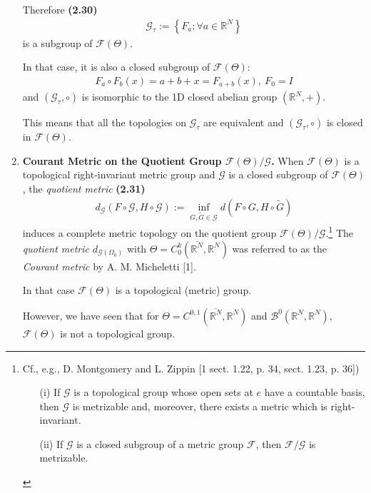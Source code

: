 \documentclass{book}
\numberwithin{equation}{section}
\begin{document}
\begin{enumerate}
    Therefore \textbf{(2.30)}
    \begin{align*}
        \mathcal{G}_\tau := \left\{F_a;\forall a\in\mathbb{R}^N\right\}
    \end{align*}
    is a subgroup of $\mathcal{F}(\Theta)$.
    
    In that case, it is also a closed subgroup of $\mathcal{F}(\Theta)$:
    \begin{align*}
        F_a\circ F_b(x) = a + b + x = F_{a+b}(x),\ F_0 = I
    \end{align*}
    and $(\mathcal{G}_\tau,\circ)$ is isomorphic to the 1D closed abelian group $(\mathbb{R}^N,+)$.
    
    This means that all the topologies on $\mathcal{G}_\tau$ are equivalent and $(\mathcal{G}_\tau,\circ)$ is closed in $\mathcal{F}(\Theta)$.
    \item \textbf{Courant Metric on the Quotient Group $\mathcal{F}(\Theta)/\mathcal{G}$.} When $\mathcal{F}(\Theta)$ is a topological right-invariant metric group and $\mathcal{G}$ is a closed subgroup of $\mathcal{F}(\Theta)$, the \textit{quotient metric} \textbf{(2.31)}
    \begin{align*}
        d_{\mathcal{G}}\left(F\circ\mathcal{G},H\circ\mathcal{G}\right) := \inf_{G,\widetilde{G}\in\mathcal{G}} d\left(F\circ G,H\circ\widetilde{G}\right)
    \end{align*}
    induces a complete metric topology on the quotient group $\mathcal{F}(\Theta)/\mathcal{G}$.\footnote{Cf., e.g., D. Montgomery and L. Zippin [1 sect. 1.22, p. 34, sect. 1.23, p. 36])
        \begin{itemize}
            \item[(i)] If $\mathcal{G}$ is a topological group whose open sets at $e$ have a countable basis, then $\mathcal{G}$ is metrizable and, moreover, there exists a metric which is right-invariant.
            \item[(ii)] If $\mathcal{G}$ is a closed subgroup of a metric group $\mathcal{F}$, then $\mathcal{F}/\mathcal{G}$ is metrizable.
    \end{itemize}}
    The \textit{quotient metric} $d_{\mathcal{G}\left(\Omega_0\right)}$ with $\Theta = C_0^k(\overline{\mathbb{R}^N},\mathbb{R}^N)$ was referred to as the \textit{Courant metric} by A. M. Micheletti [1].
    
    In that case $\mathcal{F}(\Theta)$ is a topological (metric) group.
    
    However, we have seen that for $\Theta = C^{0,1}(\overline{\mathbb{R}^N},\mathbb{R}^N)$ and $\mathcal{B}^0(\mathbb{R}^N,\mathbb{R}^N)$, $\mathcal{F}(\Theta)$ is not a topological group.
    

\end{enumerate}
\end{document}

